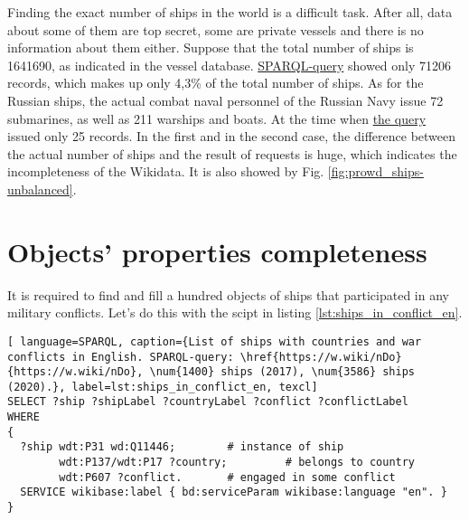 Finding the exact number of ships in the world is a difficult task. After all, data about some of them are top secret, some are private vessels and there is no information about them either. Suppose that the total number of ships is \num{1641690}, as indicated in the vessel database\cite{FleetMon}. \href{https://w.wiki/koU}{SPARQL-query} showed only \num{71206} records, which makes up only 4,3\%  of the total number of ships. As for the Russian ships, the actual combat naval personnel of the Russian Navy\cite{RussianShips} issue 72 submarines, as well as 211 warships and boats. At the time when \href{https://w.wiki/koS}{the query} issued only 25 records. In the first and in the second case, the difference between the actual number of ships and the result of requests is huge, which indicates the incompleteness of the Wikidata. It is also showed by Fig. \ref{fig:prowd_ships-unbalanced}.



\section{Objects' properties completeness}

It is required to find and fill a hundred objects of ships that participated in any military conflicts. Let's do this with the scipt in listing \ref{lst:ships_in_conflict_en}.
\begin{lstlisting}[ language=SPARQL, caption={List of ships with countries and war conflicts in English. SPARQL-query: \href{https://w.wiki/nDo}{https://w.wiki/nDo}, \num{1400} ships (2017), \num{3586} ships (2020).}, label=lst:ships_in_conflict_en, texcl]
SELECT ?ship ?shipLabel ?countryLabel ?conflict ?conflictLabel
WHERE
{
  ?ship wdt:P31 wd:Q11446;        # instance of ship
        wdt:P137/wdt:P17 ?country;         # belongs to country
        wdt:P607 ?conflict.       # engaged in some conflict
  SERVICE wikibase:label { bd:serviceParam wikibase:language "en". }
}
\end{lstlisting}


